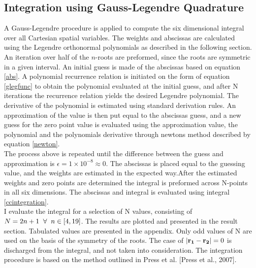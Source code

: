 \documentclass[%
reprint,
amsmath,amssymb,
aps,
]{revtex4-1}
\begin{document}
\subsection{Integration using Gauss-Legendre Quadrature}\noindent 
A Gauss-Legendre procedure is applied to compute the six dimensional integral over all Cartesian spatial variables. The weights and abscissas are calculated using the Legendre orthonormal  polynomials as described in the following section. \\ \indent  
An iteration over half of the $n$-roots are preformed, since the roots are symmetric in a given interval. An initial guess is made of the abscissas based on equation \ref{abs}. A polynomial recurrence relation is initiated on the form of equation \ref{glegfunc} to obtain the polynomial evaluated at the initial guess, and after N iterations the recurrence relation yields the desired Legendre polynomial. The derivative of the polynomial is estimated using standard derivation rules. An approximation of the value is then put equal to the abscissas guess, and a new guess for the zero point value is evaluated using the approximation value, the polynomial and the polynomials derivative through newtons method described by equation \ref{newton}.\\ \indent The process above is repeated until the difference between the guess and approximation is $\epsilon = 1\times 10^{-8} \approx 0$. The abscissas is placed equal to the guessing value, and the weights are estimated in the expected way.After the estimated weights and zero points are determined the integral is preformed across N-points in all six dimensions. The abscissas and integral is evaluated using integral \ref{ccintegration}. \\ \indent I evaluate the integral for a selection of N values, consisting of $N = 2n+1 \hspace{2mm} \forall \hspace{2mm}n\in[4,19]$. The results are plotted and presented in the result section. Tabulated values are presented in the appendix. Only odd values of N are used on the basis of the symmetry of the roots. The case of  $\abs{\mathbf{r_1} -\mathbf{r_2}} = 0$ is discharged from the integral, and not taken into consideration. The integration procedure is based on the method outlined in Press et al. [Press et al., 2007].
\end{document}

